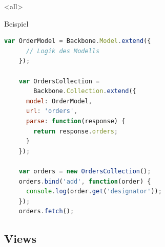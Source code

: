 \mode
<all>


\begin{Frame}[fragile]{Beispiel}
  \begin{lstlisting}[language=JavaScript,gobble=4]
    var OrderModel = Backbone.Model.extend({
      // Logik des Modells
    });
    
    var OrdersCollection =
        Backbone.Collection.extend({
      model: OrderModel,
      url: 'orders',
      parse: function(response) {
        return response.orders;
      }
    });
    
    var orders = new OrdersCollection();
    orders.bind('add', function(order) {
      console.log(order.get('designator'));
    });
    orders.fetch();
  \end{lstlisting}
\end{Frame}

\subsection{Views}

